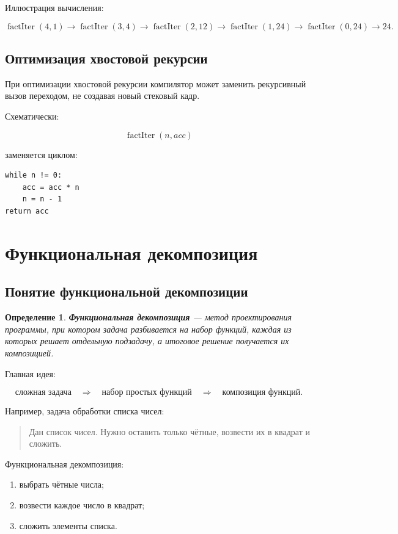 \documentclass[12pt,a4paper]{article}
\newtheorem{definition}{Определение}
\begin{document}
Иллюстрация вычисления:

\[
\operatorname{factIter}(4,1)
\to
\operatorname{factIter}(3,4)
\to
\operatorname{factIter}(2,12)
\to
\operatorname{factIter}(1,24)
\to
\operatorname{factIter}(0,24)
\to
24.
\]

\subsection{Оптимизация хвостовой рекурсии}

При оптимизации хвостовой рекурсии компилятор может заменить рекурсивный вызов переходом, не создавая новый стековый кадр.

Схематически:

\[
\operatorname{factIter}(n,acc)
\]

заменяется циклом:

\begin{lstlisting}
while n != 0:
    acc = acc * n
    n = n - 1
return acc
\end{lstlisting}

\section{Функциональная декомпозиция}

\subsection{Понятие функциональной декомпозиции}

\begin{definition}
\textbf{Функциональная декомпозиция} --- метод проектирования программы, при котором задача разбивается на набор функций, каждая из которых решает отдельную подзадачу, а итоговое решение получается их композицией.
\end{definition}

Главная идея:

\[
\text{сложная задача}
\quad \Rightarrow \quad
\text{набор простых функций}
\quad \Rightarrow \quad
\text{композиция функций}.
\]

Например, задача обработки списка чисел:

\begin{quote}
Дан список чисел. Нужно оставить только чётные, возвести их в квадрат и сложить.
\end{quote}

Функциональная декомпозиция:

\begin{enumerate}
  \item выбрать чётные числа;
  \item возвести каждое число в квадрат;
  \item сложить элементы списка.
\end{enumerate}
\end{document}
